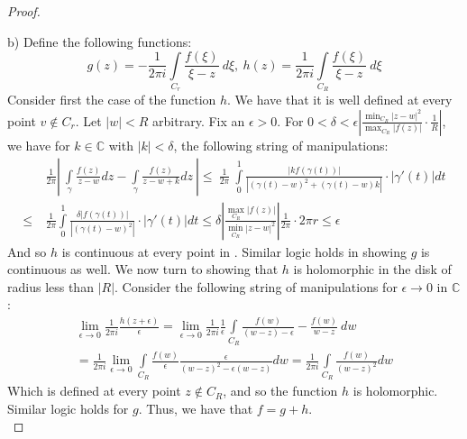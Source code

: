 \documentclass{article}
\newcommand{\bb}[1]{\mathbb{#1}}
\begin{document}
\begin{proof}
\begin{center}

\end{center}

b) Define the following functions:
\[
  g(z) = - \frac{1}{2\pi i}\int\limits_{C_{r}}\frac{f(\xi)}{\xi -z} \ d\xi, \ h(z) = \frac{1}{2\pi i}\int\limits_{C_{R}}\frac{f(\xi)}{\xi -z} \ d\xi
\]
 Consider first the case of the function $h$. We have that it is well defined at every point $v \notin C_{r}$. Let $|w| < R$ arbitrary. Fix an $\epsilon> 0$. For  $0 < \delta < \epsilon\left|\frac{\min_{C_{R}}|z-w|^{2}}{\max_{C_{R}}|f(z)|}\cdot\frac{1}{R}\right| $, we have for $k \in \bb{C}$ with $|k| < \delta$, the following string of manipulations:
  \begin{align*}
    & \frac{1}{2 \pi}\left| \ \int\limits_{\gamma} \frac{f(z)}{z-w}dz - \int\limits_{\gamma} \frac{f(z)}{z-w + k}dz \ \right| \leq \ \frac{1}{2\pi} \ \int\limits_{0}^{1} \frac{|kf(\gamma(t))|}{|(\gamma(t)-w)^{2} + (\gamma(t)-w)k|}\cdot |\gamma'(t)| dt \\
    \leq \ & \frac{1}{2 \pi}\int\limits_{0}^{1} \frac{\delta |f(\gamma(t))|}{|(\gamma(t)-w)^{2}|} \cdot |\gamma'(t)|dt \leq \delta \left|\frac{\max_{C_{R}} |f(z)|}{\min_{C_{R}}|z-w|^{2}}\right|\frac{1}{2\pi} \cdot 2 \pi r \leq \epsilon
  \end{align*}
  And so $h$ is continuous at every point in . Similar logic holds in showing $g$ is continuous as well. We now turn to showing that $h$ is holomorphic in the disk of radius less than $|R|$. Consider the following string of manipulations for $\epsilon \to 0$ in $\bb{C}$:
  \begin{align*}
    \lim_{\epsilon \to 0}\frac{1}{2\pi i}\frac{h(z+\epsilon)}{\epsilon} = \lim_{\epsilon\to 0} \frac{1}{2\pi i}\frac{1}{\epsilon}\int\limits_{C_{R}}\frac{f(w)}{(w - z) - \epsilon} - \frac{f(w)}{w-z} \ dw \\
    = \frac{1}{2\pi i}\lim_{\epsilon\to 0}\int\limits_{C_{R}}\frac{f(w)}{\epsilon} \frac{\epsilon}{(w-z)^{2} - \epsilon(w-z)} dw = \frac{1}{2\pi i}\int\limits_{C_{R}}\frac{f(w)}{(w-z)^{2}} dw 
  \end{align*}
  Which is defined at every point $z \notin C_{R}$, and so the function $h$ is holomorphic. Similar logic holds for $g$. Thus, we have that $f = g + h$. \\


\end{proof}
\end{document}
